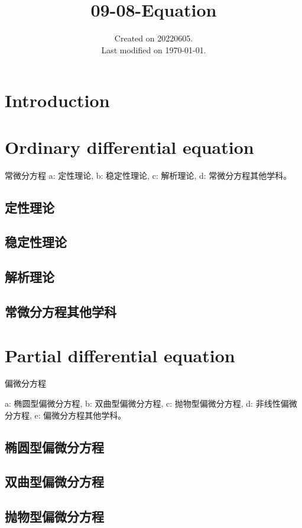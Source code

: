 \documentclass[UTF8]{../09-Mathematics}
\begin{document}
\title{09-08-Equation}
\date{Created on 20220605.\\   Last modified on \today.}
\maketitle
\tableofcontents


\chapter{Introduction}


\chapter{Ordinary differential equation}

常微分方程
a: 定性理论, 
b: 稳定性理论, 
c: 解析理论,
d: 常微分方程其他学科。

\section{定性理论}
\section{稳定性理论}
\section{解析理论}
\section{常微分方程其他学科}



\chapter{Partial differential equation}
偏微分方程

a: 椭圆型偏微分方程, 
b: 双曲型偏微分方程, 
c: 抛物型偏微分方程, 
d: 非线性偏微分方程, 
e: 偏微分方程其他学科。

\section{椭圆型偏微分方程}
\section{双曲型偏微分方程}
\section{抛物型偏微分方程}
\end{document}
